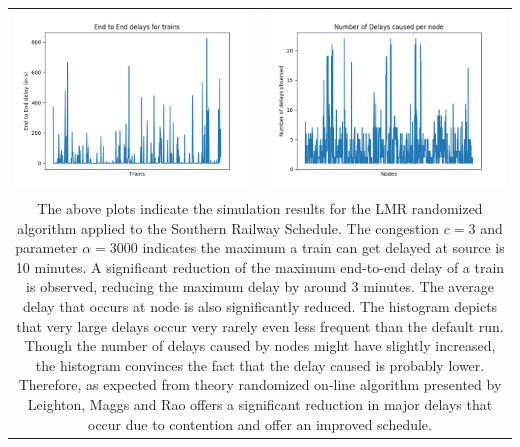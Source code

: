 \documentclass[twoside,11pt]{article}
\begin{document}
\begin{tabular}{cc}
\includegraphics[scale=0.4]{img/LMR/alpha=3000/figure_1-2.png} 
&
\includegraphics[scale=0.4]{img/LMR/alpha=3000/figure_1-3.png}  \\
\multicolumn{2}{p{\textwidth}}{
The above plots indicate the simulation results for the LMR randomized algorithm applied to the Southern Railway Schedule. The congestion $c = 3$ and parameter $\alpha = 3000$ indicates the maximum a train can get delayed at source is 10 minutes. \newline \newline
A significant reduction of the maximum end-to-end delay of a train is observed,  reducing the maximum delay by around 3 minutes. The average delay that occurs at node is also significantly reduced. The histogram depicts that very large delays occur very rarely even less frequent than the default run. Though the number of delays caused by nodes might have slightly increased, the histogram convinces the fact that the delay caused is probably lower. \newline \newline
Therefore, as expected from theory randomized on-line algorithm presented by Leighton, Maggs and Rao \cite{LMR} offers a significant reduction in major delays that occur due to contention and offer an improved schedule.
\vspace{1.6in}}
\end{tabular}
\end{document}
